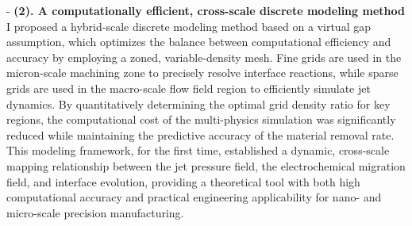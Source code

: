 \documentclass{ResearchStatement}
\begin{document}
- \textbf{(2). A computationally efficient, cross-scale discrete modeling method}
I proposed a hybrid-scale discrete modeling method based on a virtual gap assumption, which optimizes the balance between computational efficiency and accuracy by employing a zoned, variable-density mesh. Fine grids are used in the micron-scale machining zone to precisely resolve interface reactions, while sparse grids are used in the macro-scale flow field region to efficiently simulate jet dynamics. By quantitatively determining the optimal grid density ratio for key regions, the computational cost of the multi-physics simulation was significantly reduced while maintaining the predictive accuracy of the material removal rate. This modeling framework, for the first time, established a dynamic, cross-scale mapping relationship between the jet pressure field, the electrochemical migration field, and interface evolution, providing a theoretical tool with both high computational accuracy and practical engineering applicability for nano- and micro-scale precision manufacturing.
\end{document}
